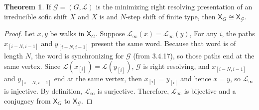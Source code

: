 \documentclass{article}
\newcommand{\Gc}{\mathcal{G}}  %
\newcommand{\Vc}{\mathcal{V}}
\newcommand{\Ec}{\mathcal{E}}
\newcommand{\shift}[1]{\mathsf{X}_{#1}}
\newcommand{\term}[1]{\textit{#1}}
\theoremstyle{definition}
\newtheorem{theorem}{Theorem}
\newtheorem{definition}{Definition}
\begin{document}
    \begin{theorem}
        If \(\mathcal{G} = (G, \mathcal{L})\) is the minimizing right resolving
        presentation of an irreducible sofic shift \(X\) and \(X\) is and
        \(N\)-step shift of finite type, then \(\shift{G} \cong \shift{\Gc}\).
    \end{theorem}
    
    \begin{proof}
        Let \(x, y\) be walks in \(\shift{G}\). Suppose \(\mathcal{L}_\infty(x)=\mathcal{L}_\infty(y)\),
        For any \(i\), the paths \(x_{[i-N, i-1]}\) and \(y_{[i-N, i-1]}\) present 
        the same word. Because that word is of length \(N\), the word is synchronizing
        for \(\mathcal{G}\) (from 3.4.17), so those paths end at the same vertex. Since
        \(\mathcal{L}(x_{[i]}) = \mathcal{L}(y_{[i]})\), \(\mathcal{G}\) is right 
        resolving, and \(x_{[i-N, i-1]}\) and \(y_{[i-N, i-1]}\) end at the same vertex,
        then \(x_{[i]} = y_{[i]}\) and hence \(x = y\), so \(\mathcal{L}_\infty\) is injective.
        By definition, \(\mathcal{L}_\infty\) is surjective. Therefore, \(\mathcal{L}_\infty\) is bijective and 
        a conjugacy from \(\mathsf{X}_G\) to \(\mathsf{X}_\mathcal{G}\).
    \end{proof}


\end{document}
